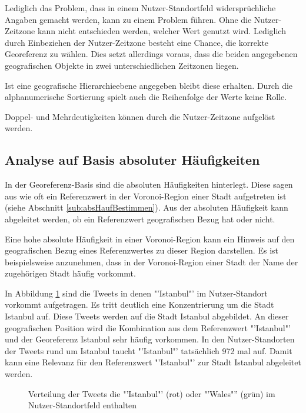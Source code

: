 			Lediglich das Problem, dass in einem Nutzer-Standortfeld widersprüchliche Angaben gemacht werden, kann zu einem Problem führen. 
			Ohne die Nutzer-Zeitzone kann nicht entschieden werden, welcher Wert genutzt wird.
			Lediglich durch Einbeziehen der Nutzer-Zeitzone besteht eine Chance, die korrekte Georeferenz zu wählen.
			Dies setzt allerdings voraus, dass die beiden angegebenen geografischen Objekte in zwei unterschiedlichen Zeitzonen liegen.

			Ist eine geografische Hierarchieebene angegeben bleibt diese erhalten.
			Durch die alphanumerische Sortierung spielt auch die Reihenfolge der Werte keine Rolle.

			Doppel- und Mehrdeutigkeiten können durch die Nutzer-Zeitzone aufgelöst werden. 
			
		\subsection{Analyse auf Basis absoluter Häufigkeiten} 

			In der Georeferenz-Basis sind die absoluten Häufigkeiten hinterlegt.
			Diese sagen aus wie oft ein Referenzwert in der Voronoi-Region einer Stadt aufgetreten ist (siehe Abschnitt \ref{sub:absHaufBestimmen}). 
			Aus der absoluten Häufigkeit kann abgeleitet werden, ob ein Referenzwert geografischen Bezug hat oder nicht.

			Eine hohe absolute Häufigkeit in einer Voronoi-Region kann ein Hinweis auf den geografischen Bezug eines Referenzwertes zu dieser Region darstellen. 
			Es ist beispielsweise anzunehmen, dass in der Voronoi-Region einer Stadt der Name der zugehörigen Stadt häufig vorkommt.

			In Abbildung \ref{img:ulIstanbulWalesZoom} sind die Tweets in denen "'Istanbul"' im Nutzer-Standort vorkommt aufgetragen.
			Es tritt deutlich eine Konzentrierung um die Stadt Istanbul auf. 
			Diese Tweets werden auf die Stadt Istanbul abgebildet.
			An dieser geografischen Position wird die Kombination aus dem Referenzwert "'Istanbul"' und der Georeferenz Istanbul sehr häufig vorkommen.
			In den Nutzer-Standorten der Tweets rund um Istanbul taucht "'Istanbul"' tatsächlich 972 mal auf.
			Damit kann eine Relevanz für den Referenzwert "'Istanbul"' zur Stadt Istanbul abgeleitet werden.

			\begin{figure}[!ht]
					\centering
						\caption{Verteilung der Tweets die "'Istanbul"' (rot) oder "'Wales"'' (grün) im Nutzer-Standortfeld enthalten}
						\label{img:ulIstanbulWalesZoom}


			\end{figure}	


